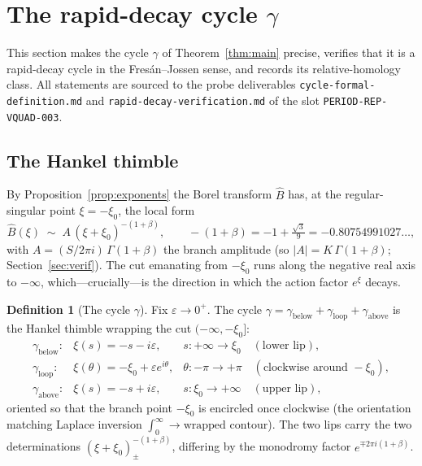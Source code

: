 \documentclass[11pt,reqno]{amsart}
\renewcommand{\_}{\vquadorigunderscore\allowbreak}
\theoremstyle{plain}
\theoremstyle{definition}
\newtheorem{definition}[theorem]{Definition}
\newcommand{\Bhat}{\widehat{B}}
\newcommand{\xizero}{\xi_0}
\begin{document}
\section{The rapid-decay cycle \texorpdfstring{$\gamma$}{gamma}}\label{sec:cycle}

This section makes the cycle $\gamma$ of Theorem~\ref{thm:main} precise, verifies that it is a
rapid-decay cycle in the Fres\'an--Jossen sense, and records its relative-homology class. All
statements are sourced to the probe deliverables
\texttt{cycle-formal-definition.md} and \texttt{rapid-decay-verification.md} of the slot
\texttt{PERIOD-REP-VQUAD-003}.

\subsection{The Hankel thimble}
By Proposition~\ref{prop:exponents} the Borel transform $\Bhat$ has, at the regular-singular
point $\xi=-\xizero$, the local form
\begin{equation}\label{eq:branch-local}
  \Bhat(\xi)\;\sim\;A\,(\xi+\xizero)^{-(1+\beta)},\qquad
  -(1+\beta)=-1+\tfrac{\sqrt3}{9}=-0.80754991027\ldots,
\end{equation}
with $A=(S/2\pi i)\,\Gamma(1+\beta)$ the branch amplitude (so $\lvert A\rvert=K\,\Gamma(1+\beta)$;
Section~\ref{sec:verif}). The cut emanating from $-\xizero$ runs along the negative real axis to
$-\infty$, which---crucially---is the direction in which the action factor $e^{\xi}$ decays.

\begin{definition}[The cycle $\gamma$]\label{def:gamma}
Fix $\varepsilon\to0^+$. The cycle $\gamma=\gamma_{\mathrm{below}}+\gamma_{\mathrm{loop}}
+\gamma_{\mathrm{above}}$ is the Hankel thimble wrapping the cut $(-\infty,-\xizero]$:
\[
\begin{array}{lll}
  \gamma_{\mathrm{below}}: & \xi(s)=-s-i\varepsilon, & s:+\infty\to\xizero \quad(\text{lower lip}),\\[2pt]
  \gamma_{\mathrm{loop}}:  & \xi(\theta)=-\xizero+\varepsilon e^{i\theta}, & \theta:-\pi\to+\pi
        \quad(\text{clockwise around }-\xizero),\\[2pt]
  \gamma_{\mathrm{above}}: & \xi(s)=-s+i\varepsilon, & s:\xizero\to+\infty \quad(\text{upper lip}),
\end{array}
\]
oriented so that the branch point $-\xizero$ is encircled once clockwise (the orientation matching
Laplace inversion $\int_0^\infty\!\to\!\text{wrapped contour}$). The two lips carry the two
determinations $(\xi+\xizero)^{-(1+\beta)}_{\pm}$, differing by the monodromy factor
$e^{\mp2\pi i(1+\beta)}$.
\end{definition}
\end{document}
